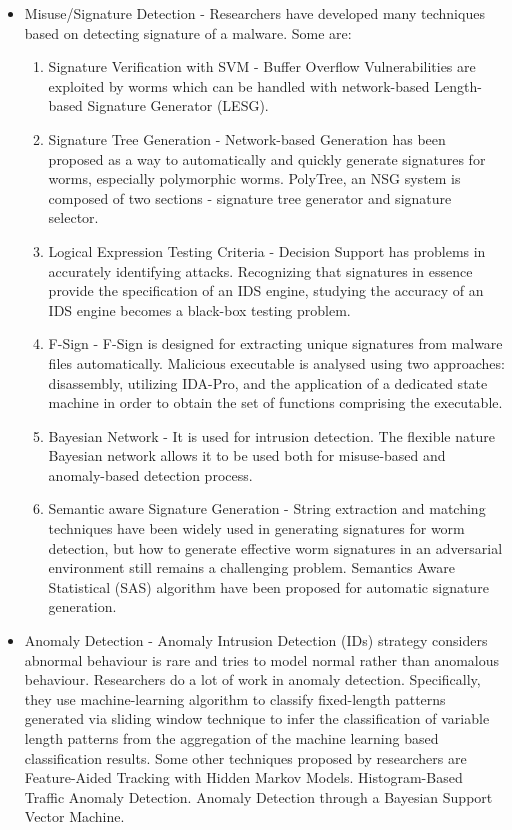 \documentclass[11pt]{article}
\begin{document}
	\begin{itemize}
		\item Misuse/Signature Detection - Researchers have developed many techniques based on detecting signature of a malware. Some are:
		\begin{enumerate}
			\item Signature Verification with SVM - Buffer Overflow Vulnerabilities are exploited by worms which can be handled with network-based Length-based Signature Generator (LESG).
			\item Signature Tree Generation - Network-based Generation has been proposed as a way to automatically and quickly generate signatures for worms, especially polymorphic worms. PolyTree, an NSG system is composed of two sections - signature tree generator and signature selector.
			\item Logical Expression Testing Criteria - Decision Support has problems in accurately identifying attacks. Recognizing that signatures in essence provide the specification of an IDS engine, studying the accuracy of an IDS engine becomes a black-box testing problem.
			\item F-Sign - F-Sign is designed for extracting unique signatures from malware files automatically. Malicious executable is analysed using two approaches: disassembly, utilizing IDA-Pro, and the application of a dedicated state machine in order to obtain the set of functions comprising the executable.
			\item Bayesian Network - It is used for intrusion detection. The flexible nature Bayesian network allows it to be used both for misuse-based and anomaly-based detection process.
			\item Semantic aware Signature Generation - String extraction and matching techniques have been widely used in generating signatures for worm detection, but how to generate effective worm signatures in an adversarial environment still remains a challenging problem. Semantics Aware Statistical (SAS) algorithm have been proposed for automatic signature generation.
		\end{enumerate}
		\item Anomaly Detection - Anomaly Intrusion Detection (IDs) strategy considers abnormal behaviour is rare and tries to model normal rather than anomalous behaviour. Researchers do a lot of work in anomaly detection. Specifically, they use machine-learning algorithm to classify fixed-length patterns generated via sliding window technique to infer the classification of variable length patterns from the aggregation of the machine learning based classification results. Some other techniques proposed by researchers are Feature-Aided Tracking with Hidden Markov Models. Histogram-Based Traffic Anomaly Detection. Anomaly Detection through a Bayesian Support Vector Machine.

\end{itemize}
\end{document}
